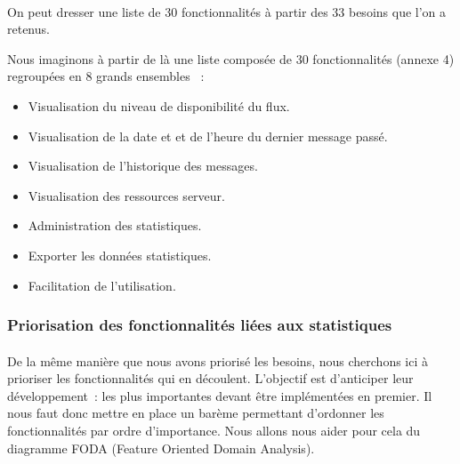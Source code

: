 			\paragraph{}%
			On peut dresser une liste de 30 fonctionnalités à partir des 33 besoins que
			l'on a retenus.
			
			
			
			
			
			
			
			
			Nous imaginons à partir de là une liste composée de 30 fonctionnalités
			(annexe 4) regroupées en 8 grands ensembles \label{ensembles_fonctios}~:
			\begin{itemize}
			  \item Visualisation du niveau de disponibilité du flux.
			  \item Visualisation de la date et et de l'heure du dernier message passé.
			  \item Visualisation de l’historique des messages.
			  \item Visualisation des ressources serveur.
			  \item Administration des statistiques.
			  \item Exporter les données statistiques.
			  \item Facilitation de l’utilisation.
			\end{itemize}
			
		\subsubsection{Priorisation des fonctionnalités liées aux statistiques}
			\paragraph{}%
			De la même manière que nous avons priorisé les besoins, nous cherchons ici à
			prioriser les fonctionnalités qui en découlent. L'objectif est
			d'anticiper leur développement~: les plus importantes
			devant être implémentées en premier. Il nous faut donc mettre en place un
			barème permettant d'ordonner les fonctionnalités par ordre d'importance. Nous
			allons nous aider pour cela du diagramme FODA (Feature Oriented Domain
			Analysis).
			
